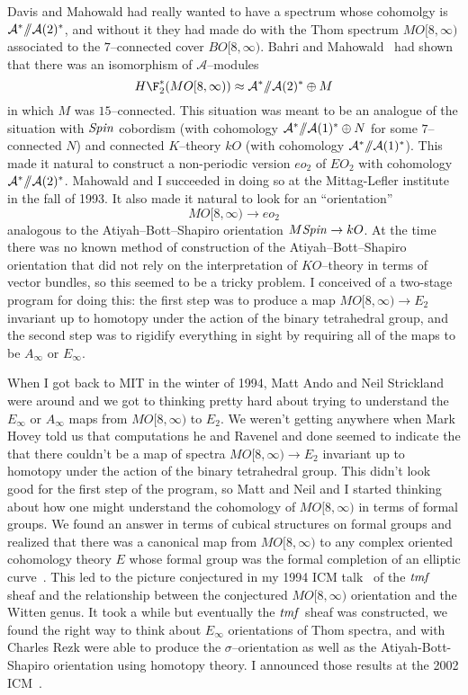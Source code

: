 Davis and Mahowald had really wanted to have a spectrum whose cohomolgy
is $\mathcal A^* /\!\!/ \mathcal A(2)^*$, and without it they had made do
with the Thom spectrum $MO[8, \infty)$ associated to the $7$--connected cover
$BO[8, \infty)$.  Bahri and Mahowald~\cite{BahriMahowald} had shown that
there was an isomorphism of $\mathcal A$--modules
\[
H\F_2^{\ast}(MO[8, \infty)) \approx \mathcal A^* \mmod \mathcal A(2)^* \oplus M
\]
in which $M$ was $15$--connected.  This situation was meant to be an
analogue of the situation with $\mathit{Spin}$ cobordism (with cohomology
$\mathcal A^* /\!\!/ \mathcal A(1)^* \oplus N$ for some $7$--connected $N$) and connected
$K$--theory $kO$ (with cohomology $\mathcal A^* /\!\!/ \mathcal A(1)^*$).  This made it
natural to construct a non-periodic version $eo_{2}$ of $EO_{2}$ with
cohomology $\mathcal A^* /\!\!/ \mathcal A(2)^*$.  Mahowald and I succeeded in doing so at
the Mittag-Lefler institute in the fall of 1993.  It also made it
natural to look for an ``orientation'' \[MO[8, \infty) \to eo_{2}\] analogous
to the Atiyah--Bott--Shapiro orientation $M\mathit{Spin} \to kO$.  At the time
there was no known method of construction of the Atiyah--Bott--Shapiro
orientation that did not rely on the interpretation of $KO$--theory in
terms of vector bundles, so this seemed to be a tricky problem.  I
conceived of a two-stage program for doing this: the first step was
to produce a map $MO[8, \infty) \to E_{2}$ invariant up to homotopy under
the action of the binary tetrahedral group, and the second step was to
rigidify everything in sight by requiring all of the maps to be
$A_{\infty}$ or $E_{\infty}$.

When I got back to MIT in the winter of 1994, Matt Ando and Neil
Strickland were around and we got to thinking pretty hard about trying
to understand the $E_{\infty}$ or $A_{\infty}$ maps from $MO[8, \infty)$ to
$E_{2}$.  We weren't getting anywhere when Mark Hovey told us that
computations he and Ravenel and done seemed to indicate the that there
couldn't be a map of spectra $MO[8, \infty) \to E_{2}$ invariant up to
homotopy under the action of the binary tetrahedral group.  This
didn't look good for the first step of the program, so Matt and Neil
and I started thinking about how one might understand the cohomology
of $MO[8, \infty)$ in terms of formal groups.  We found an answer in terms
of cubical structures on formal groups and realized that there was a
canonical map from $MO[8, \infty)$ to any complex oriented cohomology
theory $E$ whose formal group was the formal completion of an elliptic
curve~\cite{AHSTheoremOfTheCube}.  This led to the picture
conjectured in my 1994 ICM talk~\cite{HopkinsICMZurich} of the
$\mathit{tmf}$ sheaf and the relationship between the conjectured $MO[8, \infty)$
orientation and the Witten genus.  It took a while but eventually the
$\mathit{tmf}$ sheaf was constructed, we found the right way to think about
$E_{\infty}$ orientations of Thom spectra, and with Charles Rezk were
able to produce the $\sigma$--orientation as well as the
Atiyah-Bott-Shapiro orientation using homotopy theory.  I announced
those results at the 2002 ICM~\cite{HopkinsICMBeijing}.

